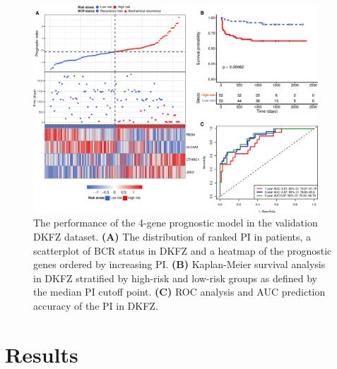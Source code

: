 \documentclass[twocolumn]{bmcart}%
\begin{document}
\begin{figure}[ht!]
    \includegraphics[width=0.95\textwidth]{figures/DKFZ_plot.png}
    \caption{The performance of the 4-gene prognostic model in the validation DKFZ dataset. \textbf{(A)} The distribution of ranked PI in patients, a scatterplot of BCR status in DKFZ and a heatmap of the prognostic genes ordered by increasing PI. \textbf{(B)} Kaplan-Meier survival analysis in DKFZ stratified by high-risk and low-risk groups as defined by the median PI cutoff point. \textbf{(C)} ROC analysis and AUC prediction accuracy of the PI in DKFZ.}
    \label{fig:dkfz_data}
\end{figure}

\section*{Results}
\end{document}
